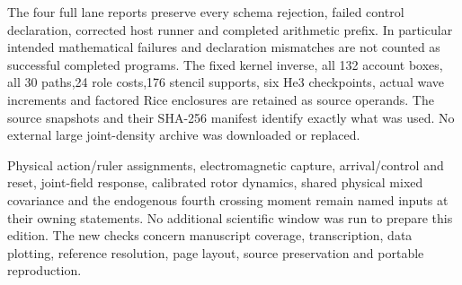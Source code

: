 The four full lane reports preserve every schema rejection, failed control
declaration, corrected host runner and completed arithmetic prefix. In
particular intended mathematical failures and declaration mismatches are
not counted as successful completed programs. The fixed kernel inverse,
all 132 account boxes, all 30 paths,24 role costs,176 stencil supports,
six He3 checkpoints, actual wave increments and factored Rice enclosures
are retained as source operands. The source snapshots and their SHA-256
manifest identify exactly what was used. No external large joint-density
archive was downloaded or replaced.

Physical action/ruler assignments, electromagnetic capture, arrival/control
and reset, joint-field response, calibrated rotor dynamics, shared physical
mixed covariance and the endogenous fourth crossing moment remain named
inputs at their owning statements. No additional scientific window was
run to prepare this edition. The new checks concern manuscript coverage,
transcription, data plotting, reference resolution, page layout, source
preservation and portable reproduction.
